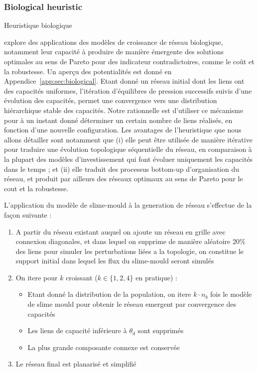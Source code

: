 \subsubsection{Biological heuristic}{Heuristique biologique}

\cite{raimbault2015labex} explore des applications des modèles de croissance de réseau biologique, notamment leur capacité à produire de manière émergente des solutions optimales au sens de Pareto pour des indicateur contradictoires, comme le coût et la robustesse. Un aperçu des potentialités est donné en Appendice~\ref{app:sec:biological}. Etant donné un réseau initial dont les liens ont des capacités uniformes, l'itération d'équilibres de pression successifs suivis d'une évolution des capacités, permet une convergence vers une distribution hiérarchique stable des capacités. Notre rationnelle est d'utiliser ce mécanisme pour à un instant donné déterminer un certain nombre de liens réalisés, en fonction d'une nouvelle configuration. Les avantages de l'heuristique que nous allons détailler sont notamment que (i) elle peut être utilisée de manière itérative pour traduire une évolution topologique séquentielle du réseau, en comparaison à la plupart des modèles d'investissement qui font évoluer uniquement les capacités dans le temps ; et (ii) elle traduit des processus bottom-up d'organisation du réseau, et produit par ailleurs des réseaux optimaux au sens de Pareto pour le cout et la robustesse.


L'application du modèle de slime-mould à la generation de réseau s'effectue de la façon suivante :

\begin{enumerate}
	\item A partir du réseau existant auquel on ajoute un réseau en grille avec connexion diagonales, et dans lequel on supprime de manière aléatoire 20\% des liens pour simuler les perturbations liées a la topologie, on constitue le support initial dans lequel les flux du slime-mould seront simulés 
	\item On itere pour $k$ croissant ($k\in \{ 1,2,4 \}$ en pratique) :
	\begin{itemize}
		\item Etant donné la distribution de la population, on itere $k\cdot n_b$ fois le modèle de slime mould pour obtenir le réseau emergent par convergence des capacités
		\item Les liens de capacité inférieure à $\theta_d$ sont supprimés
		\item La plus grande composante connexe est conservée
	\end{itemize}
	\item Le réseau final est planarisé et simplifié
\end{enumerate}


